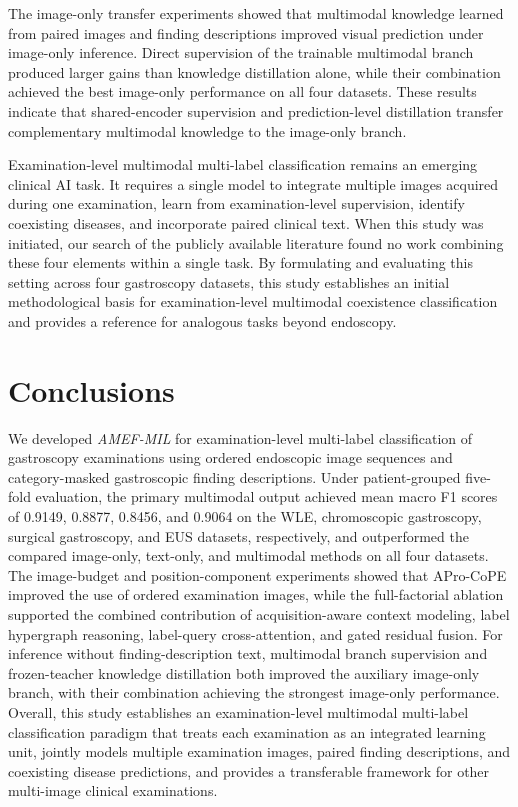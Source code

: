 \documentclass[Afour,sagev,times]{sagej}
\begin{document}
The image-only transfer experiments showed that multimodal knowledge learned from paired images and finding descriptions improved visual prediction under image-only inference. Direct supervision of the trainable multimodal branch produced larger gains than knowledge distillation alone, while their combination achieved the best image-only performance on all four datasets. These results indicate that shared-encoder supervision and prediction-level distillation transfer complementary multimodal knowledge to the image-only branch.

Examination-level multimodal multi-label classification remains an emerging clinical AI task. It requires a single model to integrate multiple images acquired during one examination, learn from examination-level supervision, identify coexisting diseases, and incorporate paired clinical text. When this study was initiated, our search of the publicly available literature found no work combining these four elements within a single task. By formulating and evaluating this setting across four gastroscopy datasets, this study establishes an initial methodological basis for examination-level multimodal coexistence classification and provides a reference for analogous tasks beyond endoscopy.

\section{Conclusions}

We developed \textit{AMEF-MIL} for examination-level multi-label classification of gastroscopy examinations using ordered endoscopic image sequences and category-masked gastroscopic finding descriptions. Under patient-grouped five-fold evaluation, the primary multimodal output achieved mean macro F1 scores of 0.9149, 0.8877, 0.8456, and 0.9064 on the WLE, chromoscopic gastroscopy, surgical gastroscopy, and EUS datasets, respectively, and outperformed the compared image-only, text-only, and multimodal methods on all four datasets. The image-budget and position-component experiments showed that APro-CoPE improved the use of ordered examination images, while the full-factorial ablation supported the combined contribution of acquisition-aware context modeling, label hypergraph reasoning, label-query cross-attention, and gated residual fusion. For inference without finding-description text, multimodal branch supervision and frozen-teacher knowledge distillation both improved the auxiliary image-only branch, with their combination achieving the strongest image-only performance. Overall, this study establishes an examination-level multimodal multi-label classification paradigm that treats each examination as an integrated learning unit, jointly models multiple examination images, paired finding descriptions, and coexisting disease predictions, and provides a transferable framework for other multi-image clinical examinations.
\end{document}

